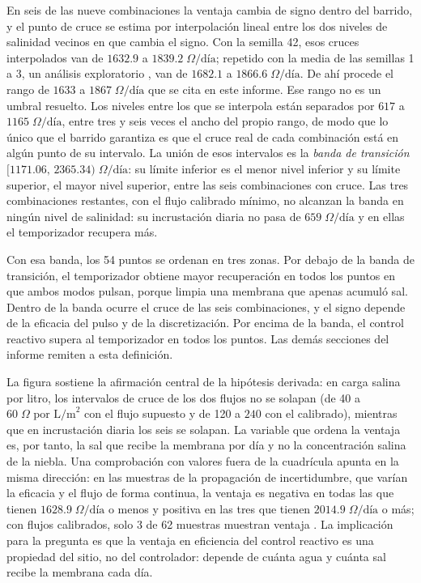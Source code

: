 En seis de las nueve combinaciones la ventaja cambia de signo dentro del barrido, y el punto de cruce se estima por interpolaci\'on lineal entre los dos niveles de salinidad vecinos en que cambia el signo. Con la semilla 42, esos cruces interpolados van de $1632.9$ a $1839.2\;\Omega\text{/d\'ia}$; repetido con la media de las semillas 1 a 3, un an\'alisis exploratorio \parencite[doc.~04, \S~8.8]{axioma2026engine}, van de $1682.1$ a $1866.6\;\Omega\text{/d\'ia}$. De ah\'i procede el rango de $1633$ a $1867\;\Omega\text{/d\'ia}$ que se cita en este informe. Ese rango no es un umbral resuelto. Los niveles entre los que se interpola est\'an separados por $617$ a $1165\;\Omega\text{/d\'ia}$, entre tres y seis veces el ancho del propio rango, de modo que lo \'unico que el barrido garantiza es que el cruce real de cada combinaci\'on est\'a en alg\'un punto de su intervalo. La uni\'on de esos intervalos es la \emph{banda de transici\'on} $[1171.06,\, 2365.34)\;\Omega\text{/d\'ia}$: su l\'imite inferior es el menor nivel inferior y su l\'imite superior, el mayor nivel superior, entre las seis combinaciones con cruce. Las tres combinaciones restantes, con el flujo calibrado m\'inimo, no alcanzan la banda en ning\'un nivel de salinidad: su incrustaci\'on diaria no pasa de $659\;\Omega\text{/d\'ia}$ y en ellas el temporizador recupera m\'as.

Con esa banda, los 54 puntos se ordenan en tres zonas. Por debajo de la banda de transici\'on, el temporizador obtiene mayor recuperaci\'on en todos los puntos en que ambos modos pulsan, porque limpia una membrana que apenas acumul\'o sal. Dentro de la banda ocurre el cruce de las seis combinaciones, y el signo depende de la eficacia del pulso y de la discretizaci\'on. Por encima de la banda, el control reactivo supera al temporizador en todos los puntos. Las dem\'as secciones del informe remiten a esta definici\'on.

La figura sostiene la afirmaci\'on central de la hip\'otesis derivada: en carga salina por litro, los intervalos de cruce de los dos flujos no se solapan (de 40 a $60\;\Omega\text{ por L/m}^2$ con el flujo supuesto y de 120 a $240$ con el calibrado), mientras que en incrustaci\'on diaria los seis se solapan. La variable que ordena la ventaja es, por tanto, la sal que recibe la membrana por d\'ia y no la concentraci\'on salina de la niebla. Una comprobaci\'on con valores fuera de la cuadr\'icula apunta en la misma direcci\'on: en las muestras de la propagaci\'on de incertidumbre, que var\'ian la eficacia y el flujo de forma continua, la ventaja es negativa en todas las que tienen $1628.9\;\Omega\text{/d\'ia}$ o menos y positiva en las tres que tienen $2014.9\;\Omega\text{/d\'ia}$ o m\'as; con flujos calibrados, solo 3 de 62 muestras muestran ventaja \parencite[doc.~04, \S~8.8]{axioma2026engine}. La implicaci\'on para la pregunta es que la ventaja en eficiencia del control reactivo es una propiedad del sitio, no del controlador: depende de cu\'anta agua y cu\'anta sal recibe la membrana cada d\'ia.

